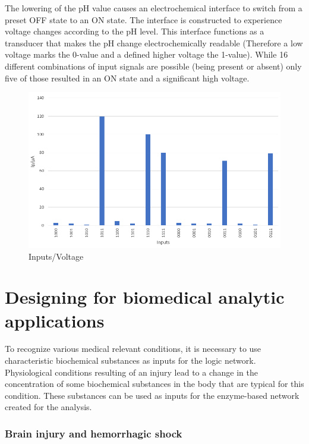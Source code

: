 \documentclass[runningheads]{llncs}
\begin{document}
		\noindent The lowering of the pH value causes an electrochemical interface to switch from a preset OFF state to an ON state. 
		The interface is constructed to experience voltage changes according to the pH level. This interface functions as a transducer that makes the pH change electrochemically readable (Therefore a low voltage marks the 0-value and a defined higher voltage the 1-value). While 16 different combinations of input signals are possible (being present or absent) only five of those resulted in an ON state and a significant high voltage. \cite{original}
		
		\begin{figure}[H] \centering \includegraphics[scale= 0.37]{pics/pH.png} \caption{Inputs/Voltage} \label{img:ph} \end{figure}
	
	

\section{Designing for biomedical analytic applications}
	To recognize various medical relevant conditions, it is necessary to use characteristic biochemical substances as inputs for the logic network.
	Physiological conditions resulting of an injury lead to a change in the concentration of some biochemical substances in the body that are typical for this condition. These substances can be used as inputs for the enzyme-based network created for the analysis.
	
	
	\subsubsection{Brain injury and hemorrhagic shock}
	
\end{document}
